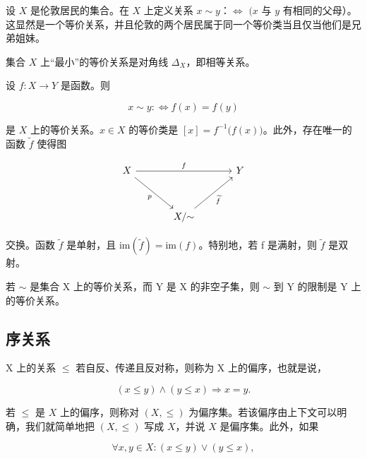 \begin{example}

\begin{items}
\item

设 $X$ 是伦敦居民的集合。在 $X$ 上定义关系 $x \sim y$：$\Leftrightarrow$ $(x$ 与 $y$ 有相同的父母）。这显然是一个等价关系，并且伦敦的两个居民属于同一个等价类当且仅当他们是兄弟姐妹。

\item

集合 $X$ 上“最小”的等价关系是对角线 $\Delta_{X}$，即相等关系。

\item

设 $f: X \to Y$ 是函数。则

\[
x\sim y:\Leftrightarrow f(x)=f(y)
\]

是 $X$ 上的等价关系。$x \in X$ 的等价类是 $[x] = f^{-1}\big(f(x)\big)$。此外，存在唯一的函数 $\widetilde{f}$ 使得图

\[
\begin{tikzcd}[row sep=3.2em, column sep=3.4em]
X \arrow[rr, "f"] \arrow[rd, "p"'] & & Y \\
 & X/{\sim} \arrow[ru, "\widetilde{f}"']
\end{tikzcd}
\]

交换。函数  $ \tilde{f} $ 是单射，且  $ \mathrm{im}(\tilde{f}) = \mathrm{im}(f) $。特别地，若 f 是满射，则  $ \tilde{f} $ 是双射。

\item

若  $ \sim $ 是集合 X 上的等价关系，而 Y 是 X 的非空子集，则  $ \sim $ 到 Y 的限制是 Y 上的等价关系。

\end{items}

\end{example}

\subsection*{序关系}

X 上的关系  $ \leq $ 若自反、传递且反对称，则称为 X 上的偏序，也就是说，

\[
(x\leq y)\land(y\leq x)\Rightarrow x=y.
\]

若 $\leq$ 是 $X$ 上的偏序，则称对 $(X,\leq)$ 为偏序集。若该偏序由上下文可以明确，我们就简单地把 $(X,\leq)$ 写成 $X$，并说 $X$ 是偏序集。此外，如果

\[
\forall x,y\in X:\left(x\leq y\right)\lor\left(y\leq x\right),
\]

